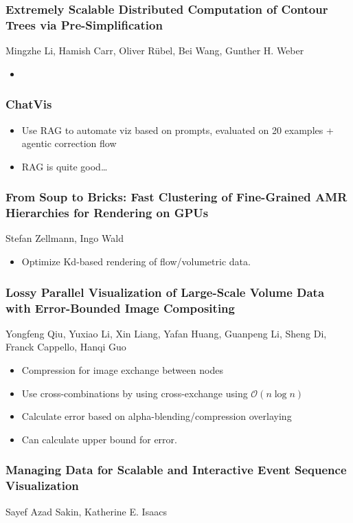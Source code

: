 \documentclass[a4paper]{article}
\begin{document}
\subsubsection{Extremely Scalable Distributed Computation of Contour Trees via Pre-Simplification}
Mingzhe Li, Hamish Carr, Oliver Rübel, Bei Wang, Gunther H. Weber
\begin{itemize}
    \item
\end{itemize}
\subsubsection{ChatVis}
\begin{itemize}
    \item Use RAG to automate viz based on prompts, evaluated on 20 examples + agentic correction flow
    \item RAG is quite good\dots
\end{itemize}
\subsubsection{From Soup to Bricks: Fast Clustering of Fine-Grained AMR Hierarchies for Rendering on GPUs}
Stefan Zellmann, Ingo Wald
\begin{itemize}
    \item Optimize Kd-based rendering of flow/volumetric data.
\end{itemize}
\subsubsection{Lossy Parallel Visualization of Large-Scale Volume Data with Error-Bounded Image Compositing}
Yongfeng Qiu, Yuxiao Li, Xin Liang, Yafan Huang, Guanpeng Li, Sheng Di, Franck Cappello, Hanqi Guo
\begin{itemize}
    \item Compression for image exchange between nodes
    \item Use cross-combinations by using cross-exchange using  $\mathcal{O} (n \log n)$
    \item Calculate error based on alpha-blending/compression overlaying
    \item Can calculate upper bound for error.
\end{itemize}

\subsubsection{Managing Data for Scalable and Interactive Event Sequence Visualization}
Sayef Azad Sakin, Katherine E. Isaacs
\end{document}

